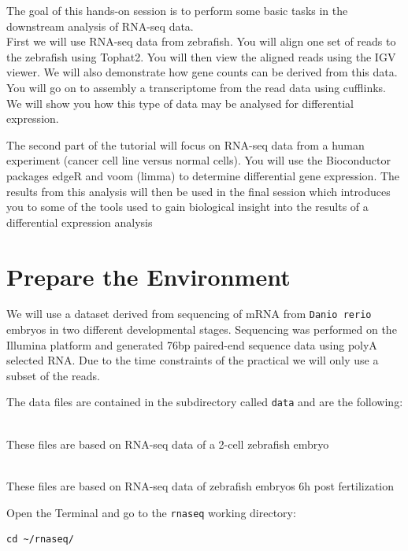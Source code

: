 The goal of this hands-on session is to perform some basic tasks in the downstream analysis of RNA-seq data.\\

First we will use RNA-seq data from zebrafish.  You will align one set of reads to the zebrafish using Tophat2. You will then  view the aligned reads using the IGV viewer. We will also demonstrate how gene counts can be derived from this data.  You will go on to assembly a transcriptome from the read data using cufflinks. We will show you how this type of data may be analysed for differential expression.
 
The second part of the tutorial will focus on RNA-seq data from a human experiment (cancer cell line versus normal cells). You will use the Bioconductor packages edgeR and voom (limma) to determine differential gene expression. The results from this analysis will then be used in the final session which introduces you to some of the tools used to gain biological insight into the results of a differential expression analysis

\section{Prepare the Environment}
We will use a dataset derived from sequencing of mRNA from \texttt{Danio rerio} embryos
in two different developmental stages. Sequencing was performed on the Illumina
platform and generated 76bp paired-end sequence data using polyA selected RNA.
Due to the time constraints of the practical we will only use a subset of the
reads.

The data files are contained in the subdirectory called \texttt{data} and are
the following:
\begin{description}[style=multiline,labelindent=1.5cm,align=left,leftmargin=2.5cm]
  \item[\texttt{2cells\_1.fastq} and \texttt{2cells\_2.fastq}] \hfill\\
 These files are based on RNA-seq data of a 2-cell zebrafish embryo
  \item[\texttt{6h\_1.fastq} and \texttt{6h\_2.fastq}] \hfill\\
 These files are based on RNA-seq data of zebrafish embryos 6h post
 fertilization
\end{description}

\begin{steps}
Open the Terminal and go to the \texttt{rnaseq} working directory:
\begin{lstlisting}
cd ~/rnaseq/
\end{lstlisting}
\end{steps}

